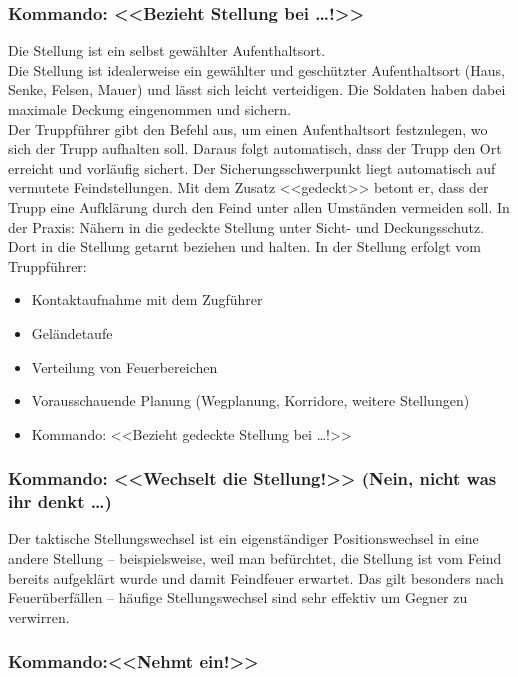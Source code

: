 \subsubsection{Kommando: <<Bezieht Stellung bei …!>>}

	Die Stellung ist ein selbst gewählter Aufenthaltsort. \\

	Die Stellung ist idealerweise ein gewählter und geschützter Aufenthaltsort (Haus, Senke, Felsen, Mauer) und lässt sich leicht verteidigen. Die Soldaten haben dabei maximale Deckung eingenommen und sichern. \\

	Der Truppführer gibt den Befehl aus, um einen Aufenthaltsort festzulegen, wo sich der Trupp aufhalten soll. Daraus folgt automatisch, dass der Trupp den Ort erreicht und vorläufig sichert. Der Sicherungsschwerpunkt liegt automatisch auf vermutete Feindstellungen. Mit dem Zusatz <<gedeckt>> betont er, dass der 		Trupp eine Aufklärung durch den Feind unter allen Umständen vermeiden soll. In der Praxis: Nähern in die gedeckte Stellung unter Sicht- und Deckungsschutz. Dort in die Stellung getarnt beziehen und halten. In der Stellung erfolgt vom Truppführer:
		\begin{itemize}
			\item Kontaktaufnahme mit dem Zugführer 
			\item Geländetaufe 
			\item Verteilung von Feuerbereichen 
			\item Vorausschauende Planung (Wegplanung, Korridore, weitere Stellungen) 
			\item Kommando: <<Bezieht gedeckte Stellung bei …!>> 
		\end{itemize}

\subsubsection{Kommando: <<Wechselt die Stellung!>> (Nein, nicht was ihr denkt …)}

	Der taktische Stellungswechsel ist ein eigenständiger Positionswechsel in eine andere Stellung – beispielsweise, weil man befürchtet, die Stellung ist vom Feind bereits aufgeklärt wurde und damit Feindfeuer erwartet. Das gilt besonders nach Feuerüberfällen – häufige Stellungswechsel sind sehr effektiv um Gegner zu verwirren. \\

\subsubsection{Kommando:<<Nehmt ein!>>}

